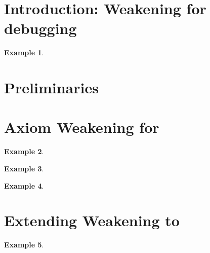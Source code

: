 \documentclass[
]{ceurart}
\newtheorem{example}{Example}
\begin{document}
\section{Introduction: Weakening for debugging}


\begin{example}
\end{example}


\section{Preliminaries}

\section{Axiom Weakening for \ALC}


\begin{example}
\end{example}


\begin{example}
\end{example}


\begin{example}
\end{example}

\section{Extending Weakening to \SROIQ}


\begin{example}
\end{example}
\end{document}
